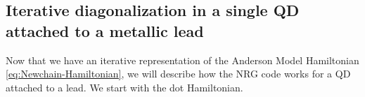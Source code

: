 
% 













\subsection{Iterative diagonalization in a single QD attached to a metallic lead \label{subsec:QD-Diag} }

Now that we have an iterative representation of the Anderson Model
Hamiltonian \eqref{eq:Newchain-Hamiltonian}, we will describe how the NRG code works for a QD attached to a lead. We start with the dot Hamiltonian.

